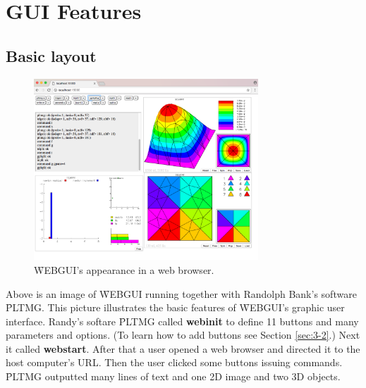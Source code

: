 \cleardoublepage
\setcounter{chapter}{3} %
\setcounter{section}{4} %
\chapter{GUI Features}
\setcounter{page}{39} %

 
\section{Basic layout}
\begin{figure}[H]
\centering
\includegraphics[width=0.75\textwidth]{pix/example2.png}
\caption{\f{WEBGUI}'s appearance in a web browser.}
\label{fig:4-1}
\end{figure} 
Above is an image of \f{WEBGUI} running together with Randolph Bank's software \f{PLTMG}. This picture illustrates
the basic features of \f{WEBGUI}'s graphic user interface. Randy's softare \f{PLTMG} called \textbf{webinit}
to define 11 buttons and many parameters and options. (To learn how to add buttons see Section \ref{sec:3-2}.)
Next it called \textbf{webstart}. After that a user opened a web browser and directed it to the host computer's URL. 
Then the user clicked some buttons issuing commands. \f{PLTMG} outputted many lines of text and one 2D
image and two 3D objects.

